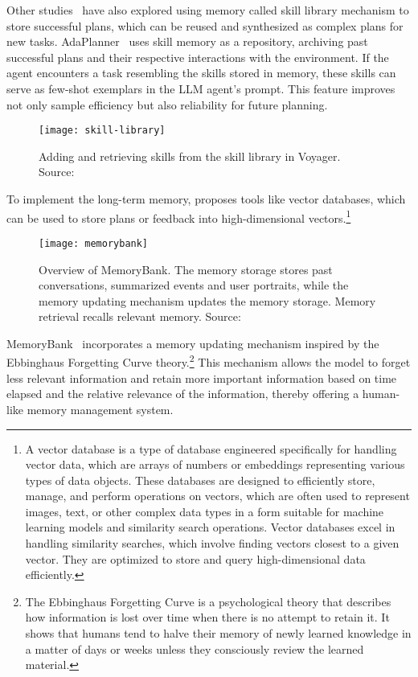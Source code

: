 Other studies~\cite{sun2023adaplanner, wang2023voyager} have also explored using memory called skill library mechanism to store successful plans, which can be reused and synthesized as complex plans for new tasks.
AdaPlanner~\cite{sun2023adaplanner} uses skill memory as a repository, archiving past successful plans and their respective interactions with the environment.
If the agent encounters a task resembling the skills stored in memory, these skills can serve as few-shot exemplars in the LLM agent’s prompt.
This feature improves not only sample efficiency but also reliability for future planning.
\begin{figure}[h!]
	\centering
	\texttt{[image: skill-library]}
	\caption{Adding and retrieving skills from the skill library in Voyager. Source: \textcite{sun2023adaplanner}}
	\label{fig:skill-library}
\end{figure}
To implement the long-term memory, \textcite{wang2023voyager, wang2021milvus} proposes tools like vector databases, which can be used to store plans or feedback into high-dimensional vectors.\footnote{A vector database is a type of database engineered specifically for handling vector data, which are arrays of numbers or embeddings representing various types of data objects.
	These databases are designed to efficiently store, manage, and perform operations on vectors, which are often used to represent images, text, or other complex data types in a form suitable for machine learning models and similarity search operations.
	Vector databases excel in handling similarity searches, which involve finding vectors closest to a given vector.
	They are optimized to store and query high-dimensional data efficiently.}
\begin{figure}[h!]
	\centering
	\texttt{[image: memorybank]}
	\caption{Overview of MemoryBank. The memory storage stores past conversations, summarized events and user portraits, while the memory updating mechanism updates the memory storage. Memory retrieval recalls relevant memory. Source: \textcite{zhong2023memorybankenhancinglargelanguage}}
	\label{fig:memorybank}
\end{figure}
MemoryBank~\cite{zhong2023memorybankenhancinglargelanguage} incorporates a memory updating mechanism inspired by the Ebbinghaus Forgetting Curve theory.\footnote{The Ebbinghaus Forgetting Curve is a psychological theory that describes how information is lost over time when there is no attempt to retain it.
	It shows that humans tend to halve their memory of newly learned knowledge in a matter of days or weeks unless they consciously review the learned material.}
This mechanism allows the model to forget less relevant information and retain more important information based on time elapsed and the relative relevance of the information, thereby offering a human-like memory management system.


